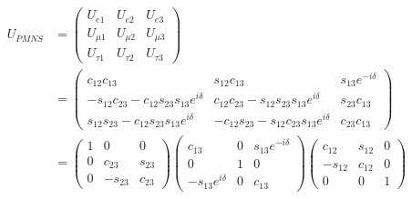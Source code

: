 \begin{align}
  U_{PMNS} &= \begin{pmatrix} U_{e1} & U_{e2} & U_{e3} \\ U_{\mu1} & U_{\mu2} & U_{\mu3} \\ U_{\tau1} & U_{\tau2} & U_{\tau3} \end{pmatrix} \label{eq:PMNS_El} \\
  &= \begin{pmatrix} c_{12}c_{13}                                  & s_{12}c_{13}                                  & s_{13}e^{-i\delta} \\
                     -s_{12}c_{23} - c_{12}s_{23}s_{13}e^{i\delta} & c_{12}c_{23} - s_{12}s_{23}s_{13}e^{i\delta}  & s_{23}c_{13}      \\
                     s_{12}s_{23} - c_{12}s_{23}s_{13}e^{i\delta}  & -c_{12}s_{23} - s_{12}c_{23}s_{13}e^{i\delta} & c_{23}c_{13}      \end{pmatrix} \label{eq:PMNS_Who}  \\
  &= \begin{pmatrix} 1 & 0 & 0                       \\ 0 & c_{23} & s_{23}  \\ 0 & -s_{23} & c_{23}            \end{pmatrix}
     \begin{pmatrix} c_{13} & 0 & s_{13}e^{-i\delta} \\ 0 & 1 & 0            \\ -s_{13}e^{i\delta} & 0 & c_{13} \end{pmatrix}
     \begin{pmatrix} c_{12} & s_{12} & 0             \\ -s_{12} & c_{12} & 0 \\ 0 & 0 & 1                       \end{pmatrix} \label{eq:PMNS_Exp}
\end{align}

